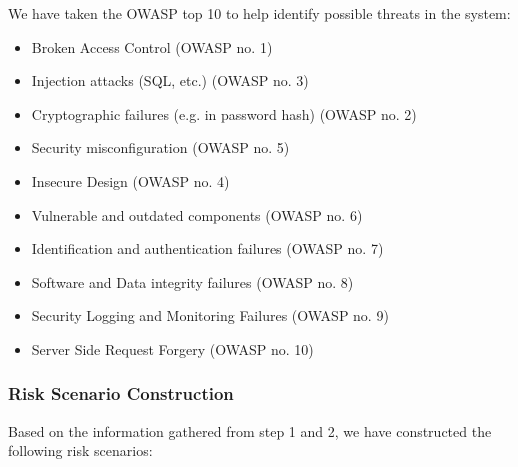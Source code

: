 We have taken the OWASP top 10 to help identify possible threats in the system:

\begin{itemize}
    \item Broken Access Control (OWASP no. 1)
    \item Injection attacks (SQL, etc.) (OWASP no. 3)
    \item Cryptographic failures (e.g. in password hash) (OWASP no. 2)
    \item Security misconfiguration (OWASP no. 5)
    \item Insecure Design (OWASP no. 4)
    \item Vulnerable and outdated components (OWASP no. 6)
    \item Identification and authentication failures (OWASP no. 7)
    \item Software and Data integrity failures (OWASP no. 8)
    \item Security Logging and Monitoring Failures (OWASP no. 9)
    \item Server Side Request Forgery (OWASP no. 10)
\end{itemize}

\subsubsection{Risk Scenario Construction}

Based on the information gathered from step 1 and 2, we have constructed the following risk scenarios:

